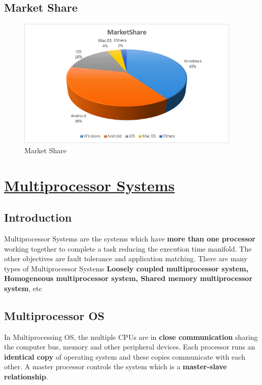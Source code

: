 \documentclass{article}
\begin{document}
     \subsection{Market Share}
\begin{figure}[H]
    \centering
    \includegraphics[width=0.95\textwidth]{Market.png}
    \caption{Market Share}
    \label{fig:MarketShare}
\end{figure}
\section{\underline{Multiprocessor Systems}}

\subsection{Introduction}
  Multiprocessor Systems are the systems which have \textbf{more than one processor} working together to complete a task reducing the execution time manifold. The other objectives are fault tolerance and application matching. There are many types of Multiprocessor Systems \textbf{Loosely coupled multiprocessor system, Homogeneous multiprocessor system, Shared memory multiprocessor system}, etc
  
 \subsection{Multiprocessor OS}
  In Multiprocessing OS, the multiple CPUs are in \textbf{close communication} sharing the computer bus, memory and other peripheral devices. Each processor runs an \textbf{identical copy} of operating system and these copies communicate with each other. A master processor controls the system which is a \textbf{master-slave relationship}.
\end{document}
